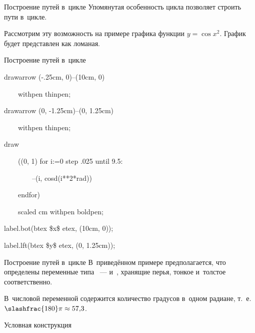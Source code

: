
\begin{frame}{Построение путей в~цикле}
Упомянутая особенность цикла  позволяет строить пути в~цикле.

Рассмотрим эту возможность на примере графика функции $y=\cos x^2$. График
будет представлен как ломаная.
\begin{center}
\end{center}
\end{frame}


\begin{frame}{Построение путей в~цикле}
\begin{programlisting}%
drawarrow (-.25cm, 0)--(10cm, 0)\par
~~~~withpen thinpen;\par
drawarrow (0, -1.25cm)--(0, 1.25cm)\par
~~~~withpen thinpen;\par
\leavevmode\par
draw\par
~~~~((0, 1) for i:=0 step .025 until 9.5:\par
~~~~~~~~--(i, cosd(i**2*rad))\par
~~~~endfor)\par
~~~~scaled cm withpen boldpen;\par
\leavevmode\par
label.bot(btex \$x\$ etex, (10cm, 0));\par
label.lft(btex \$y\$ etex, (0, 1.25cm));
\end{programlisting}
\end{frame}


\begin{frame}{Построение путей в~цикле}
В~приведённом примере предполагается, что определены переменные типа
~—  и~, хранящие перья, тонкое
и~толстое соответственно.

В~числовой переменной  содержится количество градусов в~одном
радиане, т.~е. $\slashfrac{180}\pi\approx57{,}3$.
\end{frame}


\begin{frame}{Условная конструкция}
\begin{flushleft}
\LARGE
{}\literal{:~}\\
\end{flushleft}
\end{frame}

